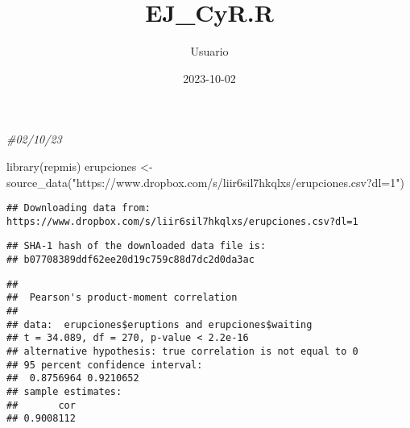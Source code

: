 \documentclass[
]{article}
\title{EJ\_CyR.R}
\author{Usuario}
\date{2023-10-02}
\newenvironment{Shaded}{\begin{snugshade}}{\end{snugshade}}
\newcommand{\CommentTok}[1]{\textcolor[rgb]{0.56,0.35,0.01}{\textit{#1}}}
\newcommand{\FunctionTok}[1]{\textcolor[rgb]{0.00,0.00,0.00}{#1}}
\newcommand{\NormalTok}[1]{#1}
\newcommand{\OtherTok}[1]{\textcolor[rgb]{0.56,0.35,0.01}{#1}}
\newcommand{\SpecialCharTok}[1]{\textcolor[rgb]{0.00,0.00,0.00}{#1}}
\newcommand{\StringTok}[1]{\textcolor[rgb]{0.31,0.60,0.02}{#1}}
\begin{document}
\maketitle

\begin{Shaded}
\begin{Highlighting}[]
\CommentTok{\#02/10/23}

\FunctionTok{library}\NormalTok{(repmis)}
\NormalTok{erupciones }\OtherTok{\textless{}{-}} \FunctionTok{source\_data}\NormalTok{(}\StringTok{"https://www.dropbox.com/s/liir6sil7hkqlxs/erupciones.csv?dl=1"}\NormalTok{)}
\end{Highlighting}
\end{Shaded}

\begin{verbatim}
## Downloading data from: https://www.dropbox.com/s/liir6sil7hkqlxs/erupciones.csv?dl=1
\end{verbatim}

\begin{verbatim}
## SHA-1 hash of the downloaded data file is:
## b07708389ddf62ee20d19c759c88d7dc2d0da3ac
\end{verbatim}

\begin{Shaded}
\end{Shaded}

\begin{verbatim}
## 
##  Pearson's product-moment correlation
## 
## data:  erupciones$eruptions and erupciones$waiting
## t = 34.089, df = 270, p-value < 2.2e-16
## alternative hypothesis: true correlation is not equal to 0
## 95 percent confidence interval:
##  0.8756964 0.9210652
## sample estimates:
##       cor 
## 0.9008112
\end{verbatim}
\end{document}
